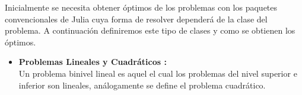 Inicialmente se necesita obtener óptimos de los problemas con los paquetes convencionales de Julia
cuya forma de resolver dependerá de la clase del problema. A continuación definiremos este tipo de clases y como se obtienen los óptimos. 


\begin{itemize}
    \item \textbf{Problemas Lineales y Cuadráticos :}\\
            Un problema binivel lineal es aquel el cual los problemas del nivel superior e inferior son lineales, análogamente se define el problema cuadrático.
            

\end{itemize}
